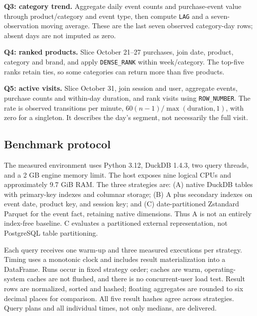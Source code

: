 \documentclass[conference]{IEEEtran}
\newcommand{\code}[1]{\texttt{\small #1}}
\begin{document}
\textbf{Q3: category trend.} Aggregate daily event counts and purchase-event value through product/category and event type, then compute \code{LAG} and a seven-observation moving average. These are the last seven observed category-day rows; absent days are not imputed as zero.

\textbf{Q4: ranked products.} Slice October 21--27 purchases, join date, product, category and brand, and apply \code{DENSE\_RANK} within week/category. The top-five ranks retain ties, so some categories can return more than five products.

\textbf{Q5: active visits.} Slice October 31, join session and user, aggregate events, purchase counts and within-day duration, and rank visits using \code{ROW\_NUMBER}. The rate is observed transitions per minute, $60(n-1)/\max(\mathrm{duration},1)$, with zero for a singleton. It describes the day's segment, not necessarily the full visit.

\subsection{Benchmark protocol}
The measured environment uses Python 3.12, DuckDB 1.4.3, two query threads, and a 2 GB engine memory limit. The host exposes nine logical CPUs and approximately 9.7 GiB RAM. The three strategies are: (A) native DuckDB tables with primary-key indexes and columnar storage; (B) A plus secondary indexes on event date, product key, and session key; and (C) date-partitioned Zstandard Parquet for the event fact, retaining native dimensions. Thus A is not an entirely index-free baseline. C evaluates a partitioned external representation, not PostgreSQL table partitioning.

Each query receives one warm-up and three measured executions per strategy. Timing uses a monotonic clock and includes result materialization into a DataFrame. Runs occur in fixed strategy order; caches are warm, operating-system caches are not flushed, and there is no concurrent-user load test. Result rows are normalized, sorted and hashed; floating aggregates are rounded to six decimal places for comparison. All five result hashes agree across strategies. Query plans and all individual times, not only medians, are delivered.
\end{document}
